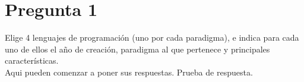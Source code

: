 \section*{Pregunta 1}
\Large 
Elige 4 lenguajes de programación (uno por cada paradigma), e indica para cada uno de ellos el año de creación, paradigma al que pertenece y principales características.\\
\newline
\large
Aqui pueden comenzar a poner sus respuestas.
\newline
Prueba de respuesta.
